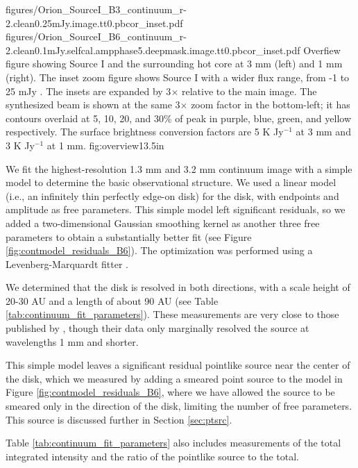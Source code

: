 \documentclass[twocolumn]{aastex61}
\begin{document}
\FigureTwo
{figures/Orion_SourceI_B3_continuum_r-2.clean0.25mJy.image.tt0.pbcor_inset.pdf}
{figures/Orion_SourceI_B6_continuum_r-2.clean0.1mJy.selfcal.ampphase5.deepmask.image.tt0.pbcor_inset.pdf}
{Overfiew figure showing Source I and the surrounding hot core at 3 mm
(left) and 1 mm (right).  The inset zoom figure shows Source I with a wider
flux range, from -1 to 25 mJy \perbeam.
The insets are expanded by 3$\times$ relative to the main image.
The synthesized beam is shown at the same 3$\times$ zoom factor in the
bottom-left; it has contours overlaid at 5, 10, 20, and 30\% of peak
in purple, blue, green, and yellow respectively.
The surface brightness conversion factors are 5 K Jy$^{-1}$ at 3 mm and 3
K Jy$^{-1}$ at 1 mm.
}
{fig:overview}{1}{3.5in}

We fit the highest-resolution 1.3 mm and 3.2 mm continuum image with a simple
model to determine the basic
observational structure.  We used a linear model (i.e., an infinitely thin
perfectly edge-on disk) for the disk, with endpoints and amplitude as free parameters.
This simple model left significant residuals, so we added a two-dimensional
Gaussian smoothing kernel as another three free parameters to obtain a
substantially better fit (see Figure \ref{fig:contmodel_residuals_B6}).
The optimization was performed using a Levenberg-Marquardt
fitter \citep{Newville2014a}. %

We determined that the disk is resolved in both
directions, with a scale height of 20-30 AU and a length of about
90 AU (see Table \ref{tab:continuum_fit_parameters}).  These measurements
are very close to those published by \citet{Plambeck2016a}, though their data
only marginally resolved the source at wavelengths 1 mm and shorter.

This simple model leaves a significant residual pointlike source near
the center of the disk, which we measured by adding a smeared point
source to the model in Figure \ref{fig:contmodel_residuals_B6},
where we have allowed the source to be smeared only in the direction
of the disk, limiting the number of free parameters.
This source is discussed further in Section \ref{sec:ptsrc}.

Table \ref{tab:continuum_fit_parameters} also includes measurements
of the total integrated intensity and the ratio of the pointlike source to
the total.
\end{document}
